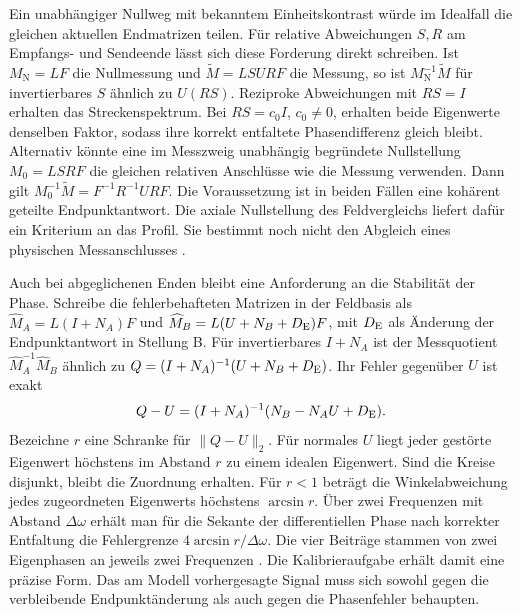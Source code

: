Ein unabhängiger Nullweg mit bekanntem Einheitskontrast würde im Idealfall die gleichen aktuellen Endmatrizen teilen. Für relative Abweichungen \(S,R\) am Empfangs- und Sendeende lässt sich diese Forderung direkt schreiben. Ist \(M_{\mathrm N}=LF\) die Nullmessung und \(\widetilde M=LSURF\) die Messung, so ist \(M_{\mathrm N}^{-1}\widetilde M\) für invertierbares \(S\) ähnlich zu \(U(RS)\). Reziproke Abweichungen mit \(RS=I\) erhalten das Streckenspektrum. Bei \(RS=c_0 I\), \(c_0\ne0\), erhalten beide Eigenwerte denselben Faktor, sodass ihre korrekt entfaltete Phasendifferenz gleich bleibt. Alternativ könnte eine im Messzweig unabhängig begründete Nullstellung \(M_0=LSRF\) die gleichen relativen Anschlüsse wie die Messung verwenden. Dann gilt \(M_0^{-1}\widetilde M=F^{-1}R^{-1}URF\). Die Voraussetzung ist in beiden Fällen eine kohärent geteilte Endpunktantwort. Die axiale Nullstellung des Feldvergleichs liefert dafür ein Kriterium an das Profil. Sie bestimmt noch nicht den Abgleich eines physischen Messanschlusses \cite{op5-nullpfad,op5-axis}.

Auch bei abgeglichenen Enden bleibt eine Anforderung an die Stabilität der Phase. Schreibe die fehlerbehafteten Matrizen in der Feldbasis als \(\widehat M_A=L(I+N_A)F\) und \(\widehat M_B=L(U+N_B+D_{\rm E})F\), mit \(D_{\rm E}\) als Änderung der Endpunktantwort in Stellung B. Für invertierbares \(I+N_A\) ist der Messquotient \(\widehat M_A^{-1}\widehat M_B\) ähnlich zu \(Q=(I+N_A)^{-1}(U+N_B+D_{\rm E})\). Ihr Fehler gegenüber \(U\) ist exakt
\begin{equation}
 Q-U=(I+N_A)^{-1}(N_B-N_AU+D_{\rm E}) .
 \label{eq:op5-phase-error}
\end{equation}
Bezeichne \(r\) eine Schranke für \(\|Q-U\|_2\). Für normales \(U\) liegt jeder gestörte Eigenwert höchstens im Abstand \(r\) zu einem idealen Eigenwert. Sind die Kreise disjunkt, bleibt die Zuordnung erhalten. Für \(r<1\) beträgt die Winkelabweichung jedes zugeordneten Eigenwerts höchstens \(\arcsin r\). Über zwei Frequenzen mit Abstand \(\Delta\omega\) erhält man für die Sekante der differentiellen Phase nach korrekter Entfaltung die Fehlergrenze \(4\arcsin r/\Delta\omega\). Die vier Beiträge stammen von zwei Eigenphasen an jeweils zwei Frequenzen \cite{op5-budget}. Die Kalibrieraufgabe erhält damit eine präzise Form. Das am Modell vorhergesagte Signal muss sich sowohl gegen die verbleibende Endpunktänderung als auch gegen die Phasenfehler behaupten.

